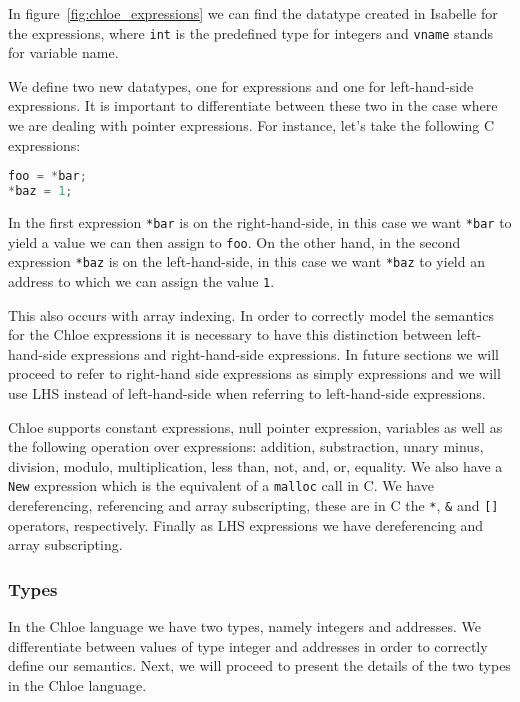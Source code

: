 In figure~\ref{fig:chloe_expressions} we can find the datatype created in Isabelle for the expressions, where \verb|int| is the predefined type for integers and \verb|vname| stands for variable name.

We define two new datatypes, one for expressions and one for left-hand-side expressions.
It is important to differentiate between these two in the case where we are dealing with pointer expressions.
For instance, let's take the following C expressions:

\begin{lstlisting}[language=C, frame=single]
foo = *bar;
*baz = 1;
\end{lstlisting}

In the first expression \verb|*bar| is on the right-hand-side, in this case we want \verb|*bar| to yield a value we can then assign to \verb|foo|.
On the other hand, in the second expression \verb|*baz| is on the left-hand-side, in this case we want \verb|*baz| to yield an address to which we can assign the value \verb|1|.

This also occurs with array indexing.
In order to correctly model the semantics for the Chloe expressions it is necessary to have this distinction between left-hand-side expressions and right-hand-side expressions.
In future sections we will proceed to refer to right-hand side expressions as simply expressions and we will use LHS instead of left-hand-side when referring to left-hand-side expressions.

Chloe supports constant expressions, null pointer expression, variables as well as the following operation over expressions: addition, substraction, unary minus, division, modulo, multiplication, less than, not, and, or, equality.
We also have a \verb|New| expression which is the equivalent of a \verb|malloc| call in C.
We have dereferencing, referencing and array subscripting, these are in C the \verb|*|, \verb|&| and \verb|[]| operators, respectively.
Finally as LHS expressions we have dereferencing and array subscripting.

\subsubsection{Types}

In the Chloe language we have two types, namely integers and addresses.
We differentiate between values of type integer and addresses in order to correctly define our semantics.
Next, we will proceed to present the details of the two types in the Chloe language.

